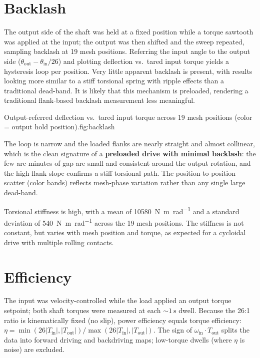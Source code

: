 \documentclass[11pt]{article}
\begin{document}
\section{Backlash}\label{sec:backlash}
The output side of the shaft was held at a fixed position while a torque sawtooth was applied at the
input; the output was then shifted and the sweep repeated, sampling backlash at
19 mesh positions. Referring the input angle to the output side
($\theta_\text{out}-\theta_\text{in}/26$) and plotting deflection vs.\ tared input
torque yields a hysteresis loop per position. Very little apparent backlash is present,
with results looking more similar to a stiff torsional spring with ripple effects than a traditional dead-band.
It is likely that this mechanism is preloaded, rendering a traditional flank-based backlash measurement less meaningful.

  {Output-referred deflection vs.\ tared input torque across 19 mesh positions
   (color = output hold position).}{fig:backlash}

The loop is narrow and the loaded flanks are nearly straight and almost
collinear, which is the clean signature of a \textbf{preloaded drive with minimal
backlash}: the few arc-minutes of gap are small and consistent around the output
rotation, and the high flank slope confirms a stiff torsional path. The
position-to-position scatter (color bands) reflects mesh-phase variation rather
than any single large dead-band.

Torsional stiffness is high, with a mean of \SI{10580}{\newton\meter\per\radian} and
  a standard deviation of \SI{540}{\newton\meter\per\radian} across the 19 mesh positions. The stiffness is not constant, but varies with mesh position and torque, as expected for a cycloidal drive with multiple rolling contacts.

\section{Efficiency}\label{sec:eff}
The input was velocity-controlled while the load applied an output torque
setpoint; both shaft torques were measured at each $\sim\!\SI{1}{\second}$ dwell.
Because the 26:1 ratio is kinematically fixed (no slip), power efficiency equals
torque efficiency: $\eta = \min(26|T_\text{in}|,|T_\text{out}|)/\max(26|T_\text{in}|,|T_\text{out}|)$.
The sign of $\omega_\text{in}\!\cdot\!T_\text{out}$ splits the data into forward
driving and backdriving maps; low-torque dwells (where $\eta$ is noise) are
excluded.
\end{document}
